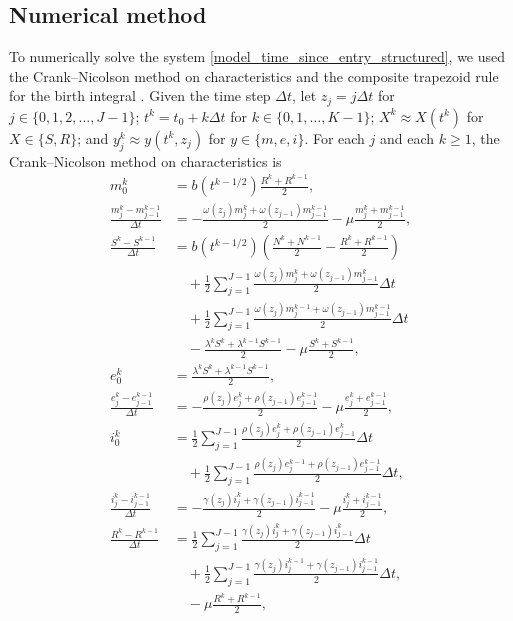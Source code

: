 \documentclass{jpmarticle}
\begin{document}
\subsection{Numerical method}

To numerically solve the system
\eqref{model_time_since_entry_structured}, we used the Crank--Nicolson
method on characteristics and the composite trapezoid rule for the birth
integral \autocite{milner_1992}.  Given the time step $\Delta t$,
let $z_j = j \Delta t$ for $j \in \{0, 1, 2, \ldots, J - 1\}$;
$t^k = t_0 + k \Delta t$ for $k \in \{0, 1, \ldots, K - 1\}$;
$X^k \approx X(t^k)$ for $X \in \{S, R\}$;
and $y_j^k \approx y(t^k, z_j)$ for $y \in \{m, e, i\}$.
For each $j$ and each $k \geq 1$, the Crank--Nicolson method on
characteristics is
\begin{equation}
  \begin{split}
    m_0^k &=
    b(t^{k - 1 / 2}) \frac{R^k + R^{k - 1}}{2},
    \\
    \frac{m_j^k - m_{j - 1}^{k - 1}}{\Delta t} &=
    - \frac{\omega(z_j) m_j^k + \omega(z_{j - 1}) m_{j - 1}^{k - 1}}{2}
    - \mu \frac{m_j^k + m_{j - 1}^{k - 1}}{2},
    \\
    \frac{S^k - S^{k - 1}}{\Delta t} &=
    b(t^{k - 1 / 2}) \left(\frac{N^k + N^{k - 1}}{2}
      - \frac{R^k + R^{k - 1}}{2}\right)
    \\ & \quad {}
    + \frac{1}{2} \sum_{j = 1}^{J - 1}
    \frac{\omega(z_j) m_j^k + \omega(z_{j - 1}) m_{j - 1}^k}{2}
    \Delta t
    \\ & \quad {}
    + \frac{1}{2} \sum_{j = 1}^{J - 1}
    \frac{\omega(z_j) m_j^{k - 1} + \omega(z_{j - 1}) m_{j - 1}^{k - 1}}{2}
    \Delta t
    \\ & \quad {}
    - \frac{\lambda^k S^k + \lambda^{k - 1} S^{k - 1}}{2}
    - \mu \frac{S^k + S^{k - 1}}{2},
    \\
    e_0^k &=
    \frac{\lambda^k S^k + \lambda^{k - 1}S^{k - 1}}{2},
    \\
    \frac{e_j^k - e_{j - 1}^{k - 1}}{\Delta t} &=
    - \frac{\rho(z_j) e_j^k + \rho(z_{j - 1}) e_{j - 1}^{k - 1}}{2}
    - \mu \frac{e_j^k + e_{j - 1}^{k - 1}}{2},
    \\
    i_0^k &=
    \frac{1}{2} \sum_{j = 1}^{J - 1}
    \frac{\rho(z_j) e_j^k + \rho(z_{j - 1}) e_{j - 1}^k}{2}
    \Delta t
    \\ & \quad {}
    + \frac{1}{2} \sum_{j = 1}^{J - 1}
    \frac{\rho(z_j) e_j^{k - 1} + \rho(z_{j - 1}) e_{j - 1}^{k - 1}}{2}
    \Delta t,
    \\
    \frac{i_j^k - i_{j - 1}^{k - 1}}{\Delta t} &=
    - \frac{\gamma(z_j) i_j^k + \gamma(z_{j - 1}) i_{j - 1}^{k - 1}}{2}
    - \mu \frac{i_j^k + i_{j - 1}^{k - 1}}{2},
    \\
    \frac{R^k - R^{k - 1}}{\Delta t} &=
    \frac{1}{2} \sum_{j = 1}^{J - 1}
    \frac{\gamma(z_j) i_j^k + \gamma(z_{j - 1}) i_{j - 1}^k}{2}
    \Delta t
    \\ & \quad {}
    + \frac{1}{2} \sum_{j = 1}^{J - 1}
    \frac{\gamma(z_j) i_j^{k - 1} + \gamma(z_{j - 1}) i_{j - 1}^{k - 1}}{2}
    \Delta t,
    \\ & \quad {}
    - \mu \frac{R^k + R^{k - 1}}{2},
  \end{split}
\end{equation}
\end{document}
